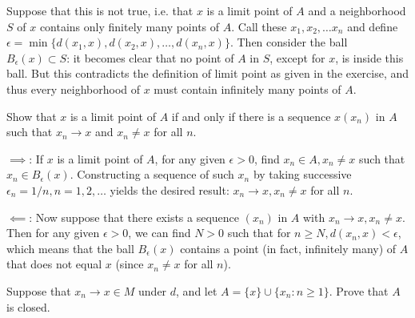 \begin{solution}
    
    Suppose that this is not true, i.e. that $x$ is a limit point of $A$ and a neighborhood $S$ of $x$ contains only finitely many points of $A$.
    Call these $x_1, x_2, \ldots x_n$ and define $\epsilon = \min\{d(x_1, x), d(x_2, x), \ldots, d(x_n, x)\}$.
    Then consider the ball $B_{\epsilon}(x) \subset S$: it becomes clear that no point of $A$ in $S$, except for $x$, is inside this ball.
    But this contradicts the definition of limit point as given in the exercise, and thus every neighborhood of $x$ must contain infinitely many points of $A$.
\end{solution}

\begin{exercise}{34}
    Show that $x$ is a limit point of $A$ if and only if there is a sequence $x(x_n)$ in $A$ such that $x_n \rightarrow x$ and $x_n \neq x$ for all $n$.
\end{exercise}

\begin{solution}
    
    $\implies$: If $x$ is a limit point of $A$, for any given $\epsilon > 0$, find $x_n \in A, x_n \neq x$ such that $x_n \in B_{\epsilon}(x)$.
    Constructing a sequence of such $x_n$ by taking successive $\epsilon_n = 1/n, n = 1, 2, \ldots$ yields the desired result: $x_n \rightarrow x, x_n \neq x$ for all $n$.

    $\impliedby$: Now suppose that there exists a sequence $(x_n)$ in $A$ with $x_n \rightarrow x, x_n \neq x$. 
    Then for any given $\epsilon > 0$, we can find $N > 0$ such that for $n \geq N, d(x_n, x) < \epsilon$, which means that the ball $B_{\epsilon}(x)$ contains a point (in fact, infinitely many) of $A$ that does not equal $x$ (since $x_n \neq x$ for all $n$).
\end{solution}

\begin{exercise}{36}
    Suppose that $x_n \rightarrow x \in M$ under $d$, and let $A = \{x\} \cup \{x_n : n \geq 1\}$.
    Prove that $A$ is closed.
\end{exercise}

